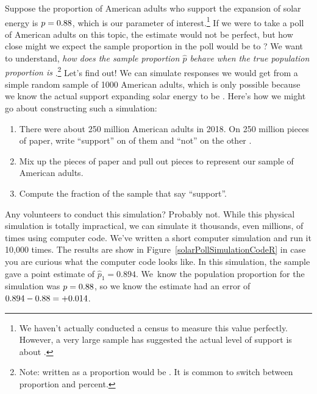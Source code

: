 Suppose the proportion of American adults who support
the expansion of solar energy is $p = 0.88{}$,
which is our parameter of interest.\footnote{We haven't
  actually conducted a census to measure this value perfectly.
  However, a very large sample has suggested the actual
  level of support is about \pewsolarparpercent{}.}
If we were to take a poll of \pewsolarpollsize{} American adults
on this topic, the estimate would not be perfect,
but how close might we expect the sample proportion
in the poll would be to \pewsolarparpercent{}?
We want to understand, \emph{how does the
sample proportion $\hat{p}$ behave when the true population
proportion is \pewsolarparprop{}}.\footnote{Note:
  \pewsolarparpercent{} written as a proportion would be
  \pewsolarparprop{}.
  It is common to switch between proportion and percent.}
Let's find out!
We can simulate responses we would get from a simple
random sample of 1000 American adults,
which is only possible because we know the actual
support expanding solar energy to be \pewsolarparprop{}.  Here's how we might go about constructing such a simulation:
\begin{enumerate}
\item There were about 250 million American adults in 2018.
    On 250 million pieces of paper, write ``support''
    on \pewsolarparpercent{} of them and ``not'' on
    the other \pewsolarparpercentcomplement{}.
\item Mix up the pieces of paper and pull out \pewsolarpollsize{}
    pieces to represent our sample of \pewsolarpollsize{}
    American adults.
\item Compute the fraction of the sample that say ``support''.
\end{enumerate}
Any volunteers to conduct this simulation? Probably not. While this physical simulation is totally impractical, we can simulate it thousands, even millions, of times using computer code.  We've written a short computer simulation and run it 10,000 times.  The results are show in 
Figure~\ref{solarPollSimulationCodeR}
in case you are curious what the computer code looks like.
In this simulation, the sample gave a point estimate of
$\hat{p}_1 = 0.894$. We~know the population proportion
for the simulation was $p = 0.88{}$, so we know
the estimate had an error of
$0.894 - 0.88{} = \text{+0.014}$.


